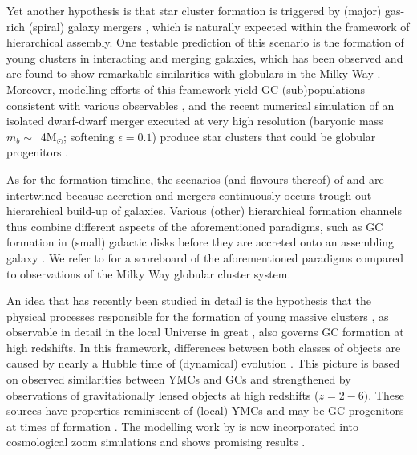 \documentclass[a4paper,fleqn,usenatbib]{mnras}
\newcommand{\Sun}[0]{\ensuremath{_{\odot}}}
\begin{document}
Yet another hypothesis is that star cluster formation is triggered by (major) 
gas-rich (spiral) galaxy mergers \citep{1987nngp.proc...18S, 1992ApJ...384...50A},
which is naturally expected within the framework of hierarchical assembly. One
testable prediction of this scenario is the formation of young clusters in
interacting and merging galaxies, which has been observed and are found to show 
remarkable similarities with globulars in the Milky Way \citep[e.g.][]{
1995AJ....109..960W, 1996AJ....112..416H, 1999AJ....118..752Z, 1999AJ....118.1551W}.
Moreover, modelling efforts of this framework yield GC (sub)populations consistent 
with various observables \citep[e.g.][]{2010ApJ...718.1266M, 2018MNRAS.480.2343C}, 
and the recent numerical simulation of an isolated dwarf-dwarf merger executed at 
very high resolution (baryonic mass $m_b \sim$~4M\Sun; softening $\epsilon = 0.1$) 
produce star clusters that could be globular progenitors \citep{
2019arXiv190509840L}.

As for the formation timeline, the scenarios (and flavours thereof) of \citet{
1985ApJ...298...18F} and \citet{1992ApJ...384...50A} are intertwined because
accretion and mergers continuously occurs trough out hierarchical build-up of
galaxies. Various (other) hierarchical formation channels thus combine different
aspects of the aforementioned paradigms, such as GC formation in (small) galactic
disks before they are accreted onto an assembling galaxy \citep[e.g.][]{
2000ApJ...533..869C, 2002ApJ...567..853C, 2002MNRAS.333..383B, 2003egcs.conf..224G}. 
We refer to \citet{2001astro.ph..8034G} for a scoreboard of the aforementioned 
paradigms compared to observations of the Milky Way globular cluster system.


An idea that has recently been studied in detail is the hypothesis that the physical 
processes responsible for the formation of young massive clusters \citep[YMCs, 
see][for a review]{2010ARA&A..48..431P}, as observable in detail in the local 
Universe in great
, also governs GC formation at high redshifts. In this framework, differences
between both classes of objects are caused by nearly a Hubble time of (dynamical)
evolution \citep[e.g.][]{1987degc.book.....S}. This picture is based on observed 
similarities between YMCs and GCs \citep[e.g.][]{1992AJ....103..691H,1999AJ....118.1551W}
and strengthened by observations of gravitationally lensed objects at high redshifts
($z = 2-6)$. These sources have properties reminiscent of (local) YMCs and may be
GC progenitors at times of formation \citep{2017MNRAS.467.4304V,2017ApJ...843L..21J}.
The modelling work by \citet{2011MNRAS.414.1339K,2012MNRAS.421.1927K,2015MNRAS.454.1658K} 
is now incorporated into cosmological zoom simulations and shows promising results
\citep{2018MNRAS.475.4309P,2019MNRAS.486.3134K}.
\end{document}
